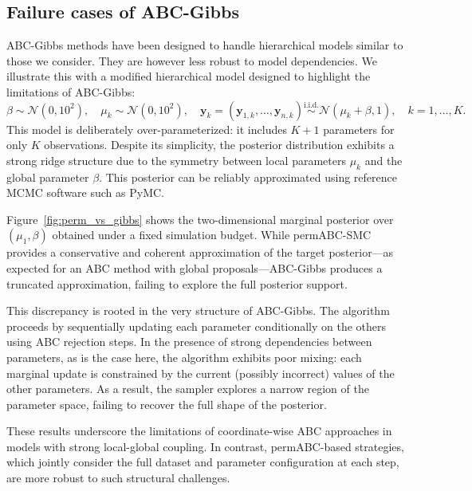 \documentclass[11pt,a4paper]{article}
\def\obsdata{\mathbf{y}}
\theoremstyle{plain}
\theoremstyle{definition}
\theoremstyle{remark}
\begin{document}
\subsection{Failure cases of ABC-Gibbs}
\label{sec:abcgibbs_failure}

ABC-Gibbs methods \citep{clarte2021componentwise,rodrigues2020likelihood} have been designed to handle hierarchical models similar to those we consider. They are however less robust to model dependencies. We illustrate this with a modified hierarchical model designed to highlight the limitations of ABC-Gibbs:
\begin{equation*}
    \label{eqgauss_robin}
    \beta \sim \mathcal{N}(0, 10^2), \quad \mu_k \sim \mathcal{N}(0, 10^2), \quad \obsdata_k = (\obsdata_{1,k}, \dots, \obsdata_{n,k}) \overset{\text{i.i.d.}}{\sim} \mathcal{N}(\mu_k + \beta, 1), \quad k = 1, \dots, K.
\end{equation*}
This model is deliberately over-parameterized: it includes \( K+1 \) parameters for only \( K \) observations. Despite its simplicity, the posterior distribution exhibits a strong ridge structure due to the symmetry between local parameters \( \mu_k \) and the global parameter \( \beta \). This posterior can be reliably approximated using reference MCMC software such as PyMC. 

Figure~\ref{fig:perm_vs_gibbs} shows the two-dimensional marginal posterior over \( (\mu_1, \beta) \) obtained under a fixed simulation budget. While permABC-SMC provides a conservative and coherent approximation of the target posterior—as expected for an ABC method with global proposals—ABC-Gibbs produces a truncated approximation, failing to explore the full posterior support.

This discrepancy is rooted in the very structure of ABC-Gibbs. The algorithm proceeds by sequentially updating each parameter conditionally on the others using ABC rejection steps. In the presence of strong dependencies between parameters, as is the case here, the algorithm exhibits poor mixing: each marginal update is constrained by the current (possibly incorrect) values of the other parameters. As a result, the sampler explores a narrow region of the parameter space, failing to recover the full shape of the posterior.

These results underscore the limitations of coordinate-wise ABC approaches in models with strong local-global coupling. In contrast, permABC-based strategies, which jointly consider the full dataset and parameter configuration at each step, are more robust to such structural challenges.
\end{document}
